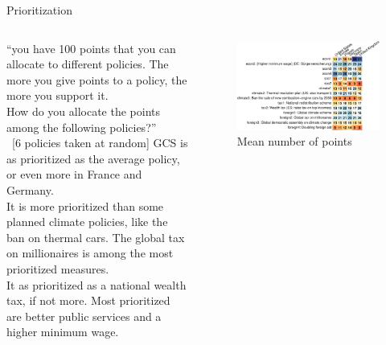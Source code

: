 \begin{framefont}{\small}
\begin{frame}{Prioritization\label{}}
    \begin{columns}
        \begin{column}{0.35\textwidth}\vspace{-1cm}
            \bbvs \ip %
			``you have 100 points that you can allocate to different policies. The more you give points to a policy, the more you support it.\\ %
            How do you allocate the points among the following policies?'' \\~[6 policies taken at random]
            \ip GCS is as prioritized as the average policy, or even more in France and Germany. \\ It is more prioritized than some planned climate policies, like the ban on thermal cars.
            \ip The global tax on millionaires is among the most prioritized measures.\\ It as prioritized as a national wealth tax, if not more.
            \ip Most prioritized are better public services and a higher minimum wage.
            \ee        %
        \end{column}
        \begin{column}{0.65\textwidth}\vspace{-.2cm}
            \begin{figure}
                \centering 
                \caption{Mean number of points}
                \vspace{-.2cm}
                \includegraphics[width=\columnwidth]{../figures/country_comparison/points_mean.pdf} 
            \end{figure}
        \end{column}
    \end{columns}
\end{frame}


\end{framefont}
